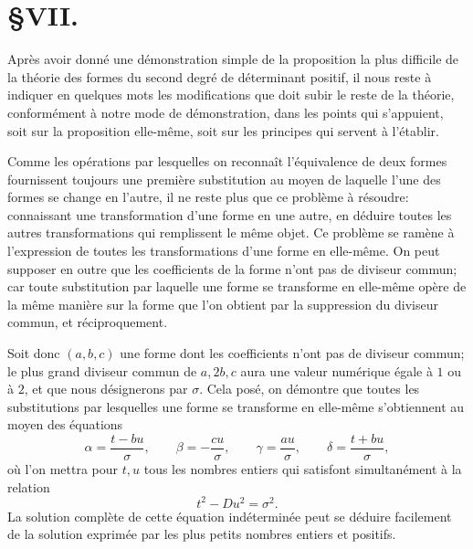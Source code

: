 \documentclass[11pt]{article}
\begin{document}
\section*{\S VII.}

Après avoir donné une démonstration simple de la proposition la plus difficile de la théorie des formes du second degré de déterminant positif, il nous reste à indiquer en quelques mots les modifications que doit subir le reste de la théorie, conformément à notre mode de démonstration, dans les points qui s'appuient, soit sur la proposition elle-même, soit sur les principes qui servent à l'établir.

Comme les opérations par lesquelles on reconnaît l'équivalence de deux formes fournissent toujours une première substitution au moyen de laquelle l'une des formes se change en l'autre, il ne reste plus que ce problème à résoudre: connaissant une transformation d'une forme en une autre, en déduire toutes les autres transformations qui remplissent le même objet. Ce problème se ramène à l'expression de toutes les transformations d'une forme en elle-même. On peut supposer en outre que les coefficients de la forme n'ont pas de diviseur commun; car toute substitution par laquelle une forme se transforme en elle-même opère de la même manière sur la forme que l'on obtient par la suppression du diviseur commun, et réciproquement.

Soit donc $(a,b,c)$ une forme dont les coefficients n'ont pas de diviseur commun; le plus grand diviseur commun de $a,2b,c$ aura une valeur numérique égale à $1$ ou à $2$, et que nous désignerons par $\sigma$. Cela posé, on démontre que toutes les substitutions par lesquelles une forme se transforme en elle-même s'obtiennent au moyen des équations
\[
 \alpha=\frac{t-bu}{\sigma},\qquad
 \beta=-\frac{cu}{\sigma},\qquad
 \gamma=\frac{au}{\sigma},\qquad
 \delta=\frac{t+bu}{\sigma},
\]
où l'on mettra pour $t,u$ tous les nombres entiers qui satisfont simultanément à la relation
\[
  t^2-Du^2=\sigma^2.
\]
La solution complète de cette équation indéterminée peut se déduire facilement de la solution exprimée par les plus petits nombres entiers et positifs.
\end{document}
